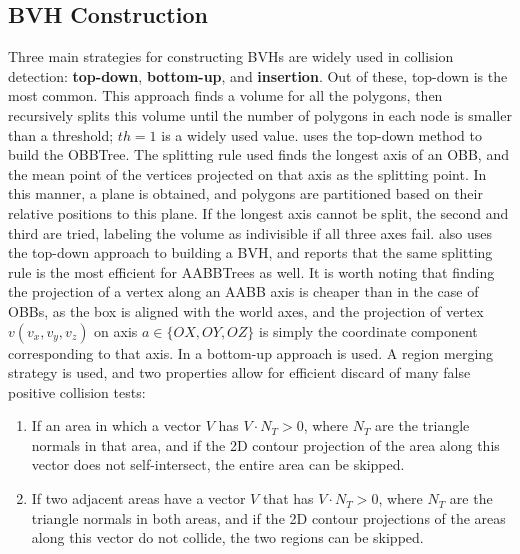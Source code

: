 \subsection{BVH Construction}
\label{sub-sec:bvhconstruction}

Three main strategies for constructing BVHs are widely used in collision detection: \textbf{top-down}, \textbf{bottom-up}, and \textbf{insertion}. Out of these, top-down is the most common. This approach finds a volume for all the polygons, then recursively splits this volume until the number of polygons in each node is smaller than a threshold; $th = 1$ is a widely used value. \cite{gott96} uses the top-down method to build the OBBTree. The splitting rule used finds the longest axis of an OBB, and the mean point of the vertices projected on that axis as the splitting point. In this manner, a plane is obtained, and polygons are partitioned based on their relative positions to this plane. If the longest axis cannot be split, the second and third are tried, labeling the volume as indivisible if all three axes fail. \citep{vdb97} also uses the top-down approach to building a BVH, and reports that the same splitting rule is the most efficient for AABBTrees as well. It is worth noting that finding the projection of a vertex along an AABB axis is cheaper than in the case of OBBs, as the box is aligned with the world axes, and the projection of vertex $v(v_{x}, v_{y}, v_{z})$ on axis $a \in \{OX, OY, OZ\}$ is simply the coordinate component corresponding to that axis. In \citep{vmt95} a bottom-up approach is used. A region merging strategy is used, and two properties allow for efficient discard of many false positive collision tests:

\begin{enumerate}
	\item \label{prop:sc1} If an area in which a vector $V$ has $V \cdot N_{T} > 0$, where $N_{T}$ are the triangle normals in that area, and if the 2D contour projection of the area along this vector does not self-intersect, the entire area can be skipped.

	\item \label{prop:sc2} If two adjacent areas have a vector $V$ that has $V \cdot N_{T} > 0$, where $N_{T}$ are the triangle normals in both areas, and if the 2D contour projections of the areas along this vector do not collide, the two regions can be skipped.
\end{enumerate}

